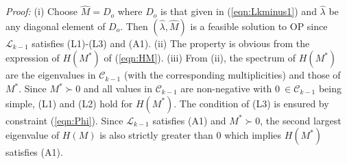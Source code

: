 \documentclass[onecolumn,reviewcopy]{autart}
\def \L{\mathcal{L}}
\def \C{\mathcal{C}}
\begin{document}
\textit{Proof:} (i) Choose $\hat{M}=D_o$ where $D_o$ is that given in (\ref{eqn:Lkminus1}) and $\hat{\lambda}$ be any diagonal element of $D_o$. Then $(\hat{\lambda},\hat{M})$ is a feasible solution to OP since $\L_{k-1}$ satisfies (L1)-(L3) and (A1). (ii) The property is obvious from the expression of $H(M^*)$ of (\ref{eqn:HM}). (iii) From (ii), the spectrum of $H(M^*)$ are the eigenvalues in $\C_{k-1}$ (with the corresponding multiplicities) and those of $M^*$. Since $M^*\succ 0$ and all values in $\C_{k-1}$ are non-negative with $0\ \in \C_{k-1}$ being simple, (L1) and (L2) hold for $H(M^*)$. The condition of (L3) is ensured by constraint (\ref{eqn:Phi}). Since $\L_{k-1}$ satisfies (A1) and $M^* \succ 0$, the second largest eigenvalue of $H(M)$ is also strictly greater than 0 which implies $H(M^*)$ satisfies (A1).
\end{document}
